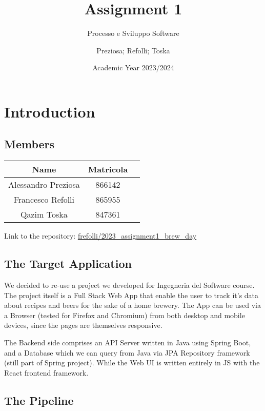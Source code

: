 \documentclass[a4paper,10pt]{scrartcl}
\title{Assignment 1}
\subtitle{Processo e Sviluppo Software}
\author{Preziosa; Refolli; Toska}
\date{Academic Year 2023/2024}
\begin{document}
\maketitle

\section{Introduction}

\subsection{Members}

\begin{center}
    \begin{tabular}{|c|c|c|}
        \hline
        Name & Matricola \\
        \hline
        Alessandro Preziosa & 866142 \\
        \hline
        Francesco Refolli & 865955 \\
        \hline
        Qazim Toska & 847361 \\
        \hline
    \end{tabular}
\end{center}

Link to the repository: \href{https://gitlab.com/frefolli/2023_assignment1_brew_day}{frefolli/2023\_assignment1\_brew\_day}

\subsection{The Target Application}

We decided to re-use a project we developed for Ingegneria del Software course. The project itself is a Full Stack Web App that enable the user to track it's data about recipes and beers for the sake of a home brewery. The App can be used via a Browser (tested for Firefox and Chromium) from both desktop and mobile devices, since the pages are themselves responsive.

The Backend side comprises an API Server written in Java using Spring Boot, and a Database which we can query from Java via JPA Repository framework (still part of Spring project). While the Web UI is written entirely in JS with the React frontend framework.

\subsection{The Pipeline}
\end{document}
